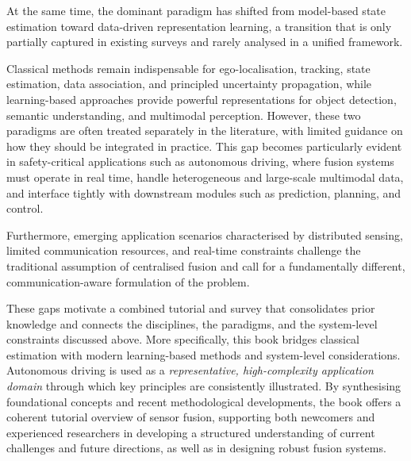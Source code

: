 \documentclass[graybox,envcountchap]{style/SNmono}
\begin{document}
At the same time, the dominant paradigm has shifted from model-based state estimation toward data-driven representation learning, a transition that is only partially captured in existing surveys and rarely analysed in a unified framework.


Classical methods remain indispensable for ego-localisation, tracking, state estimation, data association, and principled uncertainty propagation, while learning-based approaches provide powerful representations for object detection, semantic understanding, and multimodal perception. However, these two paradigms are often treated separately in the literature, with limited guidance on how they should be integrated in practice. This gap becomes particularly evident in safety-critical applications such as autonomous driving, where fusion systems must operate in real time, handle heterogeneous and large-scale multimodal data, and interface tightly with downstream modules such as prediction, planning, and control.

Furthermore, emerging application scenarios characterised by distributed sensing, limited communication resources, and real-time constraints challenge the traditional assumption of centralised fusion and call for a fundamentally different, communication-aware formulation of the problem.





These gaps motivate a combined tutorial and survey that consolidates prior knowledge and connects the disciplines, the paradigms, and the system-level constraints discussed above. More specifically, this book bridges classical estimation with modern learning-based methods and system-level considerations. Autonomous driving is used as a \emph{representative, high-complexity application domain} through which key principles are consistently illustrated. By synthesising foundational concepts and recent methodological developments, the book offers a coherent tutorial overview of sensor fusion, supporting both newcomers and experienced researchers in developing a structured understanding of current challenges and future directions, as well as in designing robust fusion systems.
\end{document}
